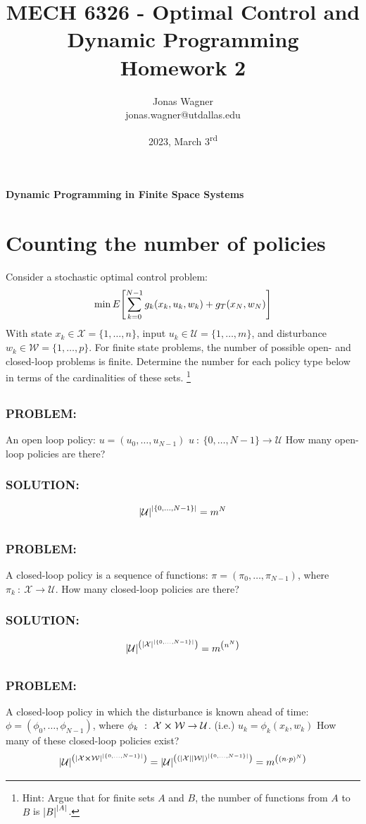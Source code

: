 \documentclass[]{article}
\title{
    MECH 6326 - Optimal Control and Dynamic Programming \\ 
    Homework 2
}
\author{Jonas Wagner\\ jonas.wagner@utdallas.edu}
\date{2023, March 3\textsuperscript{rd}}
\newcommand{\Problem}{\subsubsection*{\textbf{PROBLEM:}}}
\newcommand{\Solution}{\subsubsection*{\textbf{SOLUTION:}}}
\newcommand{\st}{\ : \ }
\begin{document}
\maketitle

\tableofcontents

\newpage
\textbf{Dynamic Programming in Finite Space Systems}
\section{Counting the number of policies}
Consider a stochastic optimal control problem:
\[
    \min E\qty[\sum_{k=0}^{N-1} g_k(x_k,u_k,w_k) + g_T(x_N,w_N)]
\]
With state $x_k \in \mathcal{X} = \{1,\dots,n\}$, input $u_k \in \mathcal{U} = \{1,\dots,m\}$, and disturbance $w_k \in \mathcal{W}=\{1,\dots,p\}$.
For finite state problems, the number of possible open- and closed-loop problems is finite.
Determine the number for each policy type below in terms of the cardinalities of these sets.
\footnote{Hint: Argue that for finite sets $A$ and $B$, the number of functions from $A$ to $B$ is $\abs{B}^{\abs{A}}$.}

\subsection{}
\Problem
An open loop policy: 
$u = (u_0,\dots,u_{N-1})$
$u \st \{0,\dots,N-1\} \to \mathcal{U}$
How many open-loop policies are there?
\Solution
\[
    \abs{\mathcal{U}}^\abs{\{0,\dots, N-1\}} = m^N
\]

\subsection{}
\Problem
A closed-loop policy is a sequence of functions: 
$\pi = (\pi_0,\dots,\pi_{N-1})$, where $\pi_k \st \mathcal{X} \to \mathcal{U}$.
How many closed-loop policies are there?
\Solution
\[
    \abs{\mathcal{U}}^\qty(\abs{\mathcal{X}}^\abs{\{0,\dots,N-1\}}) = m^\qty(n^N)
\]

\subsection{}
\Problem
A closed-loop policy in which the disturbance is known ahead of time:
$\phi = (\phi_{0},\dots,\phi_{N-1})$, where $\phi_{k} \st \mathcal{X}\cross \mathcal{W} \to \mathcal{U}$.
(i.e.) $u_k = \phi_k(x_k,w_k)$
How many of these closed-loop policies exist?
\[
    \abs{\mathcal{U}}^\qty(\abs{\mathcal{X} \cross \mathcal{W}}^\abs{\{0,\dots,N-1\}})
    = \abs{\mathcal{U}}^\qty(\qty(\abs{\mathcal{X}} \abs{\mathcal{W}})^\abs{\{0,\dots,N-1\}})
    = m^\qty((n\cdot p)^N)
\]
\end{document}
